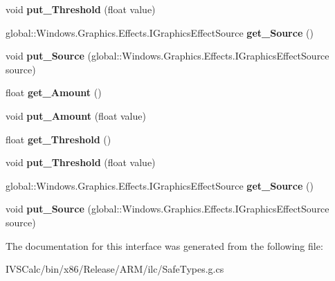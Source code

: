 \begin{DoxyCompactItemize}
void {\bfseries put\+\_\+\+Threshold} (float value)
\item 
\mbox{\label{interface_microsoft_1_1_graphics_1_1_canvas_1_1_effects_1_1_i_sharpen_effect_a93ca76a1c96c847cbdeef3cc82a68ac6}} 
global\+::\+Windows.\+Graphics.\+Effects.\+I\+Graphics\+Effect\+Source {\bfseries get\+\_\+\+Source} ()
\item 
\mbox{\label{interface_microsoft_1_1_graphics_1_1_canvas_1_1_effects_1_1_i_sharpen_effect_a88842ec0c36e706f81b03ed1a74748d2}} 
void {\bfseries put\+\_\+\+Source} (global\+::\+Windows.\+Graphics.\+Effects.\+I\+Graphics\+Effect\+Source source)
\item 
\mbox{\label{interface_microsoft_1_1_graphics_1_1_canvas_1_1_effects_1_1_i_sharpen_effect_a2643bf30d314aa459a4d7474614c50f2}} 
float {\bfseries get\+\_\+\+Amount} ()
\item 
\mbox{\label{interface_microsoft_1_1_graphics_1_1_canvas_1_1_effects_1_1_i_sharpen_effect_a3bb5e7555e2d740ab9cff31346d7c9d0}} 
void {\bfseries put\+\_\+\+Amount} (float value)
\item 
\mbox{\label{interface_microsoft_1_1_graphics_1_1_canvas_1_1_effects_1_1_i_sharpen_effect_a0bdc7c0a125711a93f0dd7328f8ca6a0}} 
float {\bfseries get\+\_\+\+Threshold} ()
\item 
\mbox{\label{interface_microsoft_1_1_graphics_1_1_canvas_1_1_effects_1_1_i_sharpen_effect_ab405cc7627dfb79867beeddb90d99055}} 
void {\bfseries put\+\_\+\+Threshold} (float value)
\item 
\mbox{\label{interface_microsoft_1_1_graphics_1_1_canvas_1_1_effects_1_1_i_sharpen_effect_a93ca76a1c96c847cbdeef3cc82a68ac6}} 
global\+::\+Windows.\+Graphics.\+Effects.\+I\+Graphics\+Effect\+Source {\bfseries get\+\_\+\+Source} ()
\item 
\mbox{\label{interface_microsoft_1_1_graphics_1_1_canvas_1_1_effects_1_1_i_sharpen_effect_a88842ec0c36e706f81b03ed1a74748d2}} 
void {\bfseries put\+\_\+\+Source} (global\+::\+Windows.\+Graphics.\+Effects.\+I\+Graphics\+Effect\+Source source)
\end{DoxyCompactItemize}


The documentation for this interface was generated from the following file\+:\begin{DoxyCompactItemize}
\item 
I\+V\+S\+Calc/bin/x86/\+Release/\+A\+R\+M/ilc/Safe\+Types.\+g.\+cs\end{DoxyCompactItemize}
